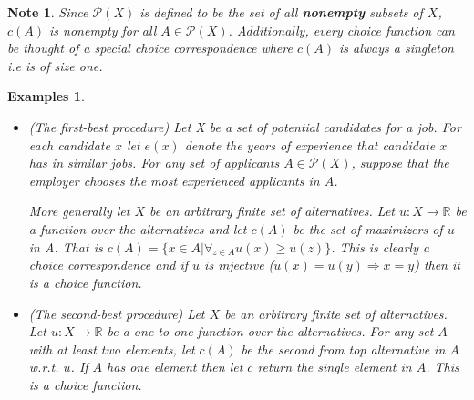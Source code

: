 \documentclass[12pt]{article}
\newtheorem{unex}[ex]{Examples}
\newtheorem*{note}{Note}
\newcommand{\tn}[1]{\textnormal{#1}}
\newcommand{\pp}[1]{\mathcal{P}(#1)}
\newcommand{\RR}{\mathbb{R}}
\newcommand{\RIGHT}{\Longrightarrow}
\newcommand{\3}{\vspace*{3mm}}
\begin{document}
\begin{note}
\tn{Since $\pp{X}$ is defined to be the set of all \textbf{nonempty} subsets of $X$, $c(A)$ is nonempty for all $A \in \pp{X}$. Additionally, every choice function can be thought of a special choice correspondence where $c(A)$ is always a singleton i.e is of size one.} 
\end{note}

\begin{unex}
\
\begin{itemize}
\item \tn{(The first-best procedure) Let X be a set of potential candidates for a job. For each candidate $x$ let $e(x)$ denote the years of experience that candidate $x$ has in similar jobs. For any set of applicants $A \in \pp{X}$, suppose that the employer chooses the most experienced applicants in $A$.}

\tn{\quad More generally let $X$ be an arbitrary finite set of alternatives. Let $u : X \to \RR$ be a function over the alternatives and let $c(A)$ be the set of maximizers of $u$ in A. That is $c(A) = \{x \in A |{\forall}_{z \in A} u(x) \geq u(z)\}$. This is clearly a choice correspondence and if $u$ is injective ($u(x) = u(y) \RIGHT x = y$) then it is a choice function.}

\item \tn{(The second-best procedure) Let $X$ be an arbitrary finite set of alternatives. Let $u : X \to \RR$ be a one-to-one function over the alternatives. For any set $A$ with at least two elements, let $c(A)$ be the second from top alternative in $A$ w.r.t. $u$. If $A$ has one element then let $c$ return the single element in $A$. This is a choice function.}


\end{itemize}
\end{unex}
\end{document}
